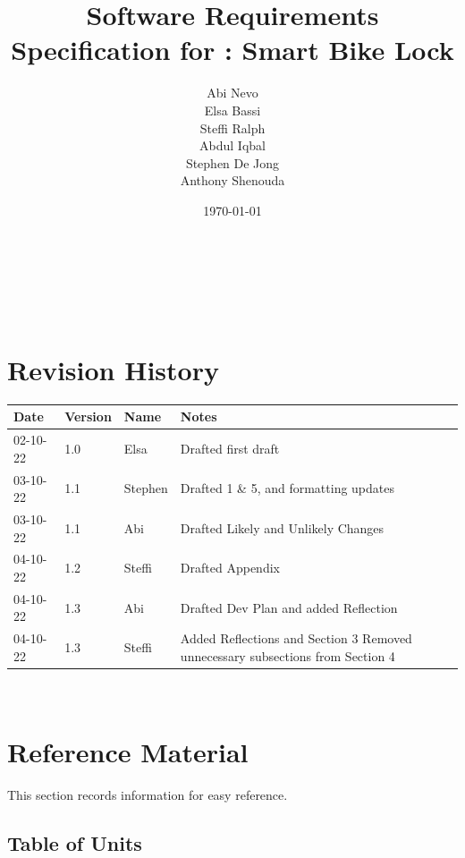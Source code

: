 \documentclass[12pt]{article}
\begin{document}
\title{Software Requirements Specification for \progname: Smart Bike Lock} 
\author{Abi Nevo\\Elsa Bassi\\Steffi Ralph\\Abdul Iqbal\\Stephen De Jong\\Anthony Shenouda}
\date{\today}
	
\maketitle

~\newpage


\tableofcontents

~\newpage

\section*{Revision History}

\begin{tabularx}{\textwidth}{p{2cm}p{2cm}p{2cm}X}
\toprule {\bf Date} & {\bf Version} & {\bf Name} & {\bf Notes}\\
\midrule
02-10-22 & 1.0 & Elsa & Drafted first draft\\
03-10-22& 1.1 & Stephen & Drafted 1 \& 5, and formatting updates\\
03-10-22 & 1.1 & Abi & Drafted Likely and Unlikely Changes\\
04-10-22& 1.2 & Steffi & Drafted Appendix\\
04-10-22 & 1.3 & Abi & Drafted Dev Plan and added Reflection\\
04-10-22 & 1.3 & Steffi & Added Reflections and Section 3 Removed unnecessary subsections from Section 4\\
\bottomrule
\end{tabularx}

~\newpage

\section{Reference Material}

This section records information for easy reference.

\subsection{Table of Units}
\end{document}

